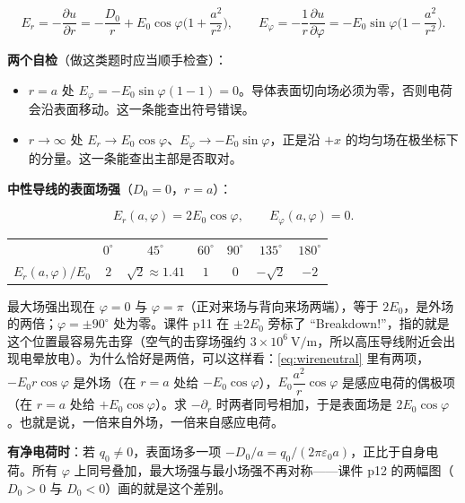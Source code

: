 \documentclass[11pt]{ctexart}
\newcommand{\tabmidrule}{\noalign{\vspace{1pt}{\color{petal}\hrule height 0.5pt}\vspace{1pt}}}
\renewcommand{\thead}[1]{\leavevmode{\bfseries\color{violetdeep}#1}}
\begin{document}
\begin{equation}
E_r=-\frac{\partial u}{\partial r}=-\frac{D_0}{r}+E_0\cos\varphi\Big(1+\frac{a^2}{r^2}\Big),
\qquad
E_\varphi=-\frac1r\frac{\partial u}{\partial\varphi}=-E_0\sin\varphi\Big(1-\frac{a^2}{r^2}\Big).
\label{eq:wireEF}
\end{equation}

\textbf{两个自检}（做这类题时应当顺手检查）：

\begin{itemize}
  \item $r=a$ 处 $E_\varphi=-E_0\sin\varphi(1-1)=0$。导体表面切向场必须为零，否则电荷会沿表面移动。这一条能查出符号错误。
  \item $r\to\infty$ 处 $E_r\to E_0\cos\varphi$、$E_\varphi\to-E_0\sin\varphi$，正是沿 $+x$ 的均匀场在极坐标下的分量。这一条能查出主部是否取对。
\end{itemize}

\textbf{中性导线的表面场强}（$D_0=0$，$r=a$）：

\[
E_r(a,\varphi)=2E_0\cos\varphi,\qquad E_\varphi(a,\varphi)=0 .
\]

\begin{center}
\tabtop
\begin{tabular}{@{}lcccccc@{}}
\thead{$\varphi$} & $0^\circ$ & $45^\circ$ & $60^\circ$ & $90^\circ$ & $135^\circ$ & $180^\circ$ \\
\tabmidrule
$E_r(a,\varphi)/E_0$ & $2$ & $\sqrt2\approx1.41$ & $1$ & $0$ & $-\sqrt2$ & $-2$ \\
\end{tabular}
\tabbot
\end{center}

最大场强出现在 $\varphi=0$ 与 $\varphi=\pi$（正对来场与背向来场两端），等于 $2E_0$，是外场的两倍；$\varphi=\pm90^\circ$ 处为零。课件 p11 在 $\pm2E_0$ 旁标了 “Breakdown!”，指的就是这个位置最容易先击穿（空气的击穿场强约 $3\times10^6\ \mathrm{V/m}$，所以高压导线附近会出现电晕放电）。为什么恰好是两倍，可以这样看：\eqref{eq:wireneutral} 里有两项，$-E_0r\cos\varphi$ 是外场（在 $r=a$ 处给 $-E_0\cos\varphi$），$E_0\dfrac{a^2}{r}\cos\varphi$ 是感应电荷的偶极项（在 $r=a$ 处给 $+E_0\cos\varphi$）。求 $-\partial_r$ 时两者同号相加，于是表面场是 $2E_0\cos\varphi$。也就是说，一倍来自外场，一倍来自感应电荷。

\textbf{有净电荷时}：若 $q_0\ne0$，表面场多一项 $-D_0/a=q_0/(2\pi\varepsilon_0a)$，正比于自身电荷。所有 $\varphi$ 上同号叠加，最大场强与最小场强不再对称——课件 p12 的两幅图（$D_0>0$ 与 $D_0<0$）画的就是这个差别。
\end{document}
